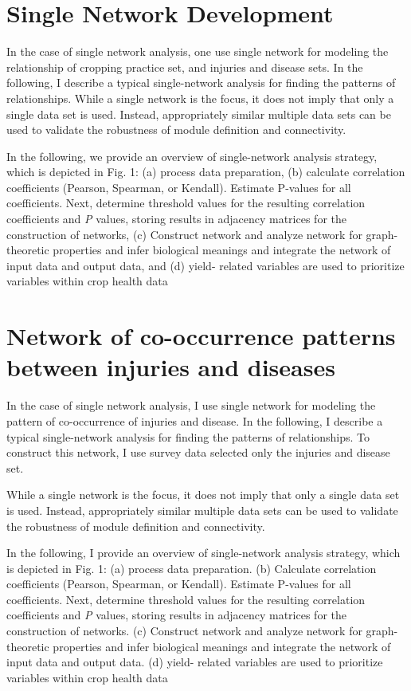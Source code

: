 \section*{Single Network Development}
In the case of single network analysis, one use single network for modeling the relationship of cropping practice set, and injuries and disease sets. In the following, I describe a typical single-network analysis for finding the patterns of relationships.
While a single network is the focus, it does not imply that only a single data set is used. Instead, appropriately similar multiple data sets can be used to validate the robustness of module definition and connectivity.

In the following, we provide an overview of single-network analysis strategy, which is depicted in Fig. 1: (a) process data preparation, (b) calculate correlation coefficients (Pearson, Spearman, or Kendall). Estimate P-values for all coefficients. Next, determine threshold values for the resulting correlation coefficients and \textit{P} values, storing results in adjacency matrices for the construction of networks, (c) Construct network and analyze network for graph-theoretic properties and infer biological meanings and integrate the network of input data and output data, and (d) yield- related variables are used to prioritize variables within crop health data

\section*{Network of co-occurrence patterns between injuries and diseases}

In the case of single network analysis, I use single network for modeling the pattern of co-occurrence of injuries and disease. In the following, I describe a typical single-network analysis for finding the patterns of relationships. To construct this network, I use survey data selected only the injuries and disease set.

While a single network is the focus, it does not imply that only a single data set is used. Instead, appropriately similar multiple data sets can be used to validate the robustness of module definition and connectivity.

In the following, I provide an overview of single-network analysis strategy, which is depicted in Fig. 1: (a) process data preparation. (b) Calculate correlation coefficients (Pearson, Spearman, or Kendall). Estimate P-values for all coefficients. Next, determine threshold values for the resulting correlation coefficients and \textit{P} values, storing results in adjacency matrices for the construction of networks. (c) Construct network and analyze network for graph-theoretic properties and infer biological meanings and integrate the network of input data and output data. (d) yield- related variables are used to prioritize variables within crop health data 

